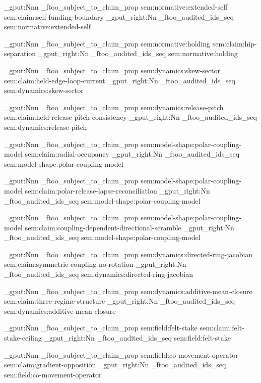 \prop_gput:Nnn \g_ftoo_subject_to_claim_prop { sem:normative:extended-self } { sem:claim:self-funding-boundary }
\seq_gput_right:Nn \g_ftoo_audited_ids_seq { sem:normative:extended-self }

\prop_gput:Nnn \g_ftoo_subject_to_claim_prop { sem:normative:holding } { sem:claim:hip-separation }
\seq_gput_right:Nn \g_ftoo_audited_ids_seq { sem:normative:holding }

\prop_gput:Nnn \g_ftoo_subject_to_claim_prop { sem:dynamics:skew-sector } { sem:claim:held-edge-loop-current }
\seq_gput_right:Nn \g_ftoo_audited_ids_seq { sem:dynamics:skew-sector }

\prop_gput:Nnn \g_ftoo_subject_to_claim_prop { sem:dynamics:release-pitch } { sem:claim:held-release-pitch-consistency }
\seq_gput_right:Nn \g_ftoo_audited_ids_seq { sem:dynamics:release-pitch }

\prop_gput:Nnn \g_ftoo_subject_to_claim_prop { sem:model-shape:polar-coupling-model } { sem:claim:radial-occupancy }
\seq_gput_right:Nn \g_ftoo_audited_ids_seq { sem:model-shape:polar-coupling-model }

\prop_gput:Nnn \g_ftoo_subject_to_claim_prop { sem:model-shape:polar-coupling-model } { sem:claim:polar-release-lapse-reconciliation }
\seq_gput_right:Nn \g_ftoo_audited_ids_seq { sem:model-shape:polar-coupling-model }

\prop_gput:Nnn \g_ftoo_subject_to_claim_prop { sem:model-shape:polar-coupling-model } { sem:claim:coupling-dependent-directional-scramble }
\seq_gput_right:Nn \g_ftoo_audited_ids_seq { sem:model-shape:polar-coupling-model }

\prop_gput:Nnn \g_ftoo_subject_to_claim_prop { sem:dynamics:directed-ring-jacobian } { sem:claim:symmetric-coupling-no-rotation }
\seq_gput_right:Nn \g_ftoo_audited_ids_seq { sem:dynamics:directed-ring-jacobian }

\prop_gput:Nnn \g_ftoo_subject_to_claim_prop { sem:dynamics:additive-mean-closure } { sem:claim:three-regime-structure }
\seq_gput_right:Nn \g_ftoo_audited_ids_seq { sem:dynamics:additive-mean-closure }

\prop_gput:Nnn \g_ftoo_subject_to_claim_prop { sem:field:felt-stake } { sem:claim:felt-stake-ceiling }
\seq_gput_right:Nn \g_ftoo_audited_ids_seq { sem:field:felt-stake }

\prop_gput:Nnn \g_ftoo_subject_to_claim_prop { sem:field:co-movement-operator } { sem:claim:gradient-opposition }
\seq_gput_right:Nn \g_ftoo_audited_ids_seq { sem:field:co-movement-operator }

